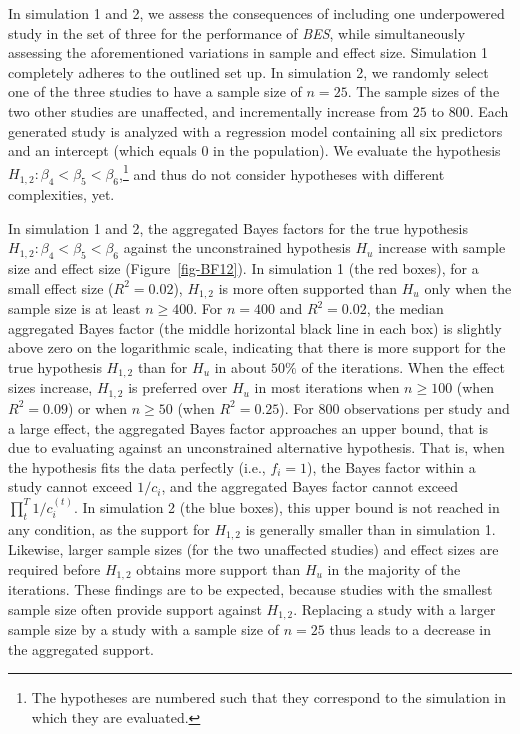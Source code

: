 \documentclass[
]{article}
\begin{document}
In simulation 1 and 2, we assess the consequences of including one
underpowered study in the set of three for the performance of
\emph{BES}, while simultaneously assessing the aforementioned variations
in sample and effect size. Simulation 1 completely adheres to the
outlined set up. In simulation 2, we randomly select one of the three
studies to have a sample size of \(n = 25\). The sample sizes of the two
other studies are unaffected, and incrementally increase from \(25\) to
\(800\). Each generated study is analyzed with a regression model
containing all six predictors and an intercept (which equals 0 in the
population). We evaluate the hypothesis
\(H_{1,2}: \beta_4 < \beta_5 < \beta_6\),\footnote{ The hypotheses are
  numbered such that they correspond to the simulation in which they are
  evaluated.} and thus do not consider hypotheses with different
complexities, yet.

In simulation 1 and 2, the aggregated Bayes factors for the true
hypothesis \(H_{1,2}: \beta_4 < \beta_5 < \beta_6\) against the
unconstrained hypothesis \(H_u\) increase with sample size and effect
size (Figure~\ref{fig-BF12}). In simulation 1 (the red boxes), for a
small effect size (\(R^2 = 0.02\)), \(H_{1,2}\) is more often supported
than \(H_u\) only when the sample size is at least \(n \geq 400\). For
\(n = 400\) and \(R^2 = 0.02\), the median aggregated Bayes factor (the
middle horizontal black line in each box) is slightly above zero on the
logarithmic scale, indicating that there is more support for the true
hypothesis \(H_{1,2}\) than for \(H_u\) in about \(50\%\) of the
iterations. When the effect sizes increase, \(H_{1,2}\) is preferred
over \(H_u\) in most iterations when \(n \geq 100\) (when
\(R^2 = 0.09\)) or when \(n \geq 50\) (when \(R^2 = 0.25\)). For \(800\)
observations per study and a large effect, the aggregated Bayes factor
approaches an upper bound, that is due to evaluating against an
unconstrained alternative hypothesis. That is, when the hypothesis fits
the data perfectly (i.e., \(f_i = 1\)), the Bayes factor within a study
cannot exceed \(1/c_i\), and the aggregated Bayes factor cannot exceed
\(\prod_t^T 1/c_i^{(t)}\). In simulation 2 (the blue boxes), this upper
bound is not reached in any condition, as the support for \(H_{1,2}\) is
generally smaller than in simulation 1. Likewise, larger sample sizes
(for the two unaffected studies) and effect sizes are required before
\(H_{1,2}\) obtains more support than \(H_u\) in the majority of the
iterations. These findings are to be expected, because studies with the
smallest sample size often provide support against \(H_{1,2}\).
Replacing a study with a larger sample size by a study with a sample
size of \(n = 25\) thus leads to a decrease in the aggregated support.
\end{document}
